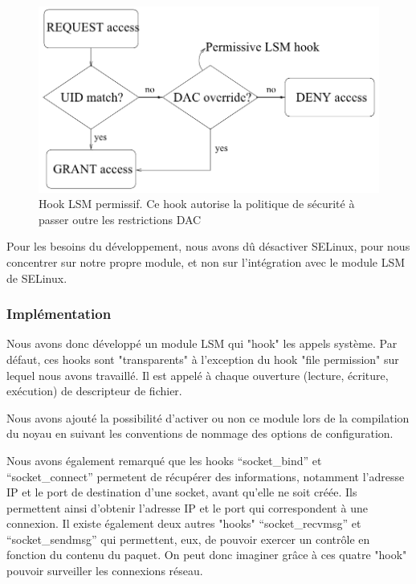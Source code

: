 \documentclass[pdftex,a4paper,titlepage,11pt]{article}
\begin{document}
\begin{figure}%
	\centering
	\includegraphics[scale=0.45]{attachements/lsm2.png}
	\caption{Hook LSM permissif. Ce hook autorise la politique de sécurité à passer outre les restrictions DAC \cite{LSMINTRO}}
\end{figure}

Pour les besoins du développement, nous avons dû désactiver SELinux, pour nous concentrer sur notre propre module, et non sur l'intégration avec le module LSM de SELinux.

\subsubsection{Implémentation}

Nous avons donc développé un module LSM qui "hook" les appels système. Par défaut, ces hooks sont "transparents" à l'exception du hook "file permission" sur lequel nous avons travaillé. Il est appelé à chaque ouverture (lecture, écriture, exécution) de descripteur de fichier.

Nous avons ajouté la possibilité d'activer ou non ce module lors de la compilation du noyau en suivant les conventions de nommage des options de configuration.

Nous avons également remarqué que les hooks ``socket\_bind'' et ``socket\_connect'' permetent de récupérer des informations, notamment l'adresse IP et le port de destination d'une socket, avant qu'elle ne soit créée. Ils permettent ainsi d'obtenir l'adresse IP et le port qui correspondent à une connexion. Il existe également deux autres "hooks" ``socket\_recvmsg'' et ``socket\_sendmsg'' qui permettent, eux, de pouvoir exercer un contrôle en fonction du contenu du paquet. On peut donc imaginer grâce à ces quatre "hook" pouvoir surveiller les connexions réseau.
\end{document}
